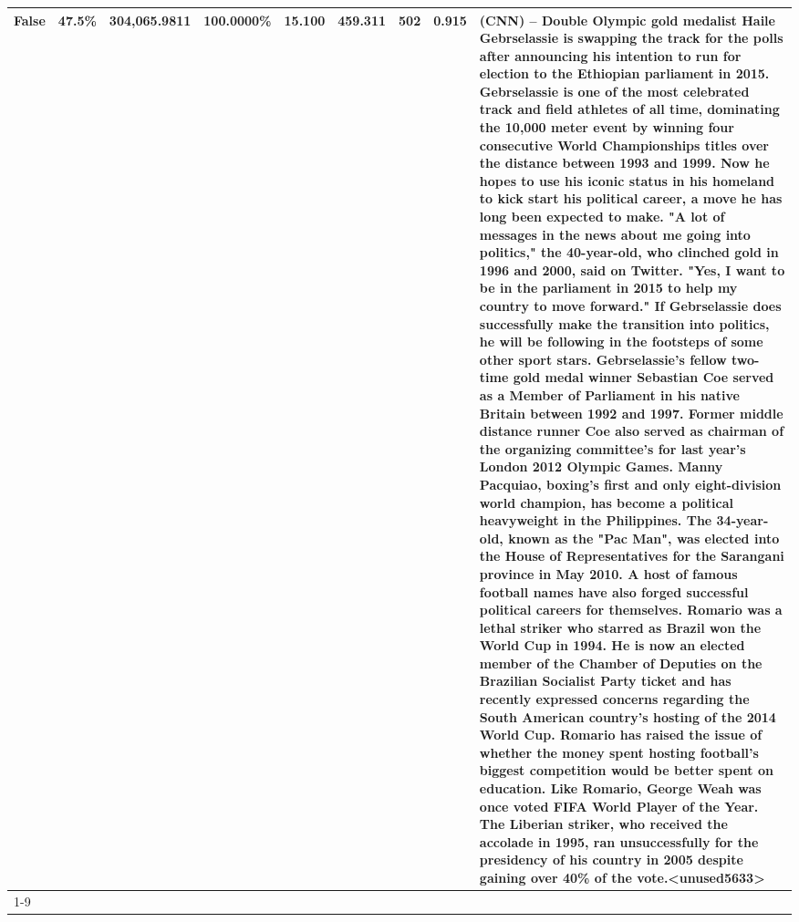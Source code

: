 \begin{table}[H]
{\begin{tabular}{lllrlllll}
False & 47.5\% & 304,065.9811 & \bfseries \color{red} 100.0000\% & 15.100 & 459.311 & 502 & 0.915 & (CNN) -- Double Olympic gold medalist Haile Gebrselassie is swapping the track for the polls after announcing his intention to run for election to the Ethiopian parliament in 2015. Gebrselassie is one of the most celebrated track and field athletes of all time, dominating the 10,000 meter event by winning four consecutive World Championships titles over the distance between 1993 and 1999. Now he hopes to use his iconic status in his homeland to kick start his political career, a move he has long been expected to make. "A lot of messages in the news about me going into politics," the 40-year-old, who clinched gold in 1996 and 2000, said on Twitter. "Yes, I want to be in the parliament in 2015 to help my country to move forward." If Gebrselassie does successfully make the transition into politics, he will be following in the footsteps of some other sport stars. Gebrselassie's fellow two-time gold medal winner Sebastian Coe served as a Member of Parliament in his native Britain between 1992 and 1997. Former middle distance runner Coe also served as chairman of the organizing committee's for last year's London 2012 Olympic Games. Manny Pacquiao, boxing's first and only eight-division world champion, has become a political heavyweight in the Philippines. The 34-year-old, known as the "Pac Man", was elected into the House of Representatives for the Sarangani province in May 2010. A host of famous football names have also forged successful political careers for themselves. Romario was a lethal striker who starred as Brazil won the World Cup in 1994. He is now an elected member of the Chamber of Deputies on the Brazilian Socialist Party ticket and has recently expressed concerns regarding the South American country's hosting of the 2014 World Cup. Romario has raised the issue of whether the money spent hosting football's biggest competition would be better spent on education. Like Romario, George Weah was once voted FIFA World Player of the Year. The Liberian striker, who received the accolade in 1995, ran unsuccessfully for the presidency of his country in 2005 despite gaining over 40\% of the vote.<unused5633> \\
\cline{1-9}

\end{tabular}}
\end{table}
